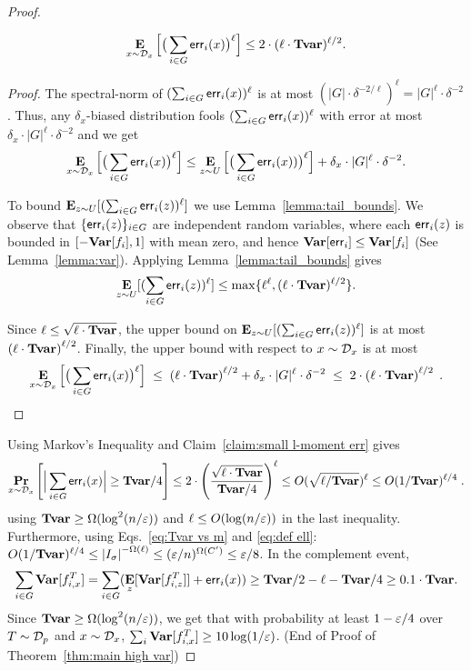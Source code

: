 \begin{proof}
\begin{claim}
	$$\mathop{\bf E\/}_{x\sim {\mathcal{D}_x}}\Big[ \big(\sum_{i\in G} {\mathsf{err}}_i(x)\big)^{\ell}\Big] \le 2 \cdot (\ell \cdot \mathbf{{Tvar}})^{\ell/2}.$$
\end{claim}
\begin{proof}
	The spectral-norm of $(\sum_{i\in G} {\mathsf{err}}_i(x))^{\ell}$ is at most $(|G| \cdot \delta^{-2/\ell})^{\ell}  = |G|^{\ell} \cdot \delta^{-2}$. Thus, any $\delta_x$-biased distribution fools $(\sum_{i\in G} {\mathsf{err}}_i(x))^{\ell}$ with error at most $\delta_x \cdot |G|^{\ell} \cdot \delta^{-2}$ and we get
	$$
	\mathop{\bf E\/}_{x\sim {\mathcal{D}_x}}\Big[ \big(\sum_{i\in G} {\mathsf{err}}_i(x)\big)^{\ell}\Big] \le \mathop{\bf E\/}_{z\sim U}\Big[ \big(\sum_{i\in G} {\mathsf{err}}_i(x))\big)^{\ell}\Big]+ \delta_x \cdot |G|^{\ell} \cdot \delta^{-2}.
	$$
	
	To bound
	$\mathop{\bf E\/}_{z\sim U}[ (\sum_{i\in G} {\mathsf{err}}_i(z))^{\ell}]$ we use Lemma~\ref{lemma:tail_bounds}.
	We observe that $\{{\mathsf{err}}_i(z)\}_{i\in G}$ are independent random variables, where each ${\mathsf{err}}_i(z)$ is bounded in $[-{\mathop{\bf Var\/}}[f_i],1]$ with mean zero, and hence ${\mathop{\bf Var\/}}[{\mathsf{err}}_i] \le {\mathop{\bf Var\/}}[f_i]$ (See Lemma~\ref{lemma:var}). Applying Lemma~\ref{lemma:tail_bounds} gives
	$$
	\mathop{\bf E\/}_{z\sim U}[ (\sum_{i\in G} {\mathsf{err}}_i(z))^{\ell}] \le  
	\max\{\ell^{\ell}, (\ell \cdot \mathbf{{Tvar}})^{\ell/2}\}.$$

Since $\ell \le \sqrt{\ell \cdot \mathbf{{Tvar}}}$, the upper bound on $\mathop{\bf E\/}_{z\sim U}[ (\sum_{i\in G} {\mathsf{err}}_i(z))^{\ell}]$ is at most $\left( \ell \cdot \mathbf{{Tvar}}\right)^{\ell/2}$.
Finally, the upper bound with respect to $x\sim {\mathcal{D}_x}$ is at most \[
\mathop{\bf E\/}_{x\sim {\mathcal{D}_x}}\Big[ \big(\sum_{i\in G} {\mathsf{err}}_i(x)\big)^{\ell}\Big] 
\;\le\;  \left(\ell  \cdot  \mathbf{{Tvar}}\right)^{\ell/2} 
	+ \delta_x \cdot |G|^{\ell} \cdot \delta^{-2}
\;\le\; 2\cdot \left(\ell  \cdot  \mathbf{{Tvar}}\right)^{\ell/2}\;.\qedhere
\]
\end{proof}
%
Using Markov's Inequality and Claim~\ref{claim:small l-moment err} gives \begin{align*}
 \mathop{\bf Pr\/}_{x\sim{\mathcal{D}_x}} \left[\Big|\sum_{i\in G} {\mathsf{err}}_i(x)\Big| \ge \mathbf{{Tvar}} / 4\right]
 \le 2\cdot \left(\frac{\sqrt{\ell \cdot \mathbf{{Tvar}}}}{\mathbf{{Tvar}}/4}\right)^{\ell} \le O(\sqrt{\ell/\mathbf{{Tvar}}})^{\ell}\le O(1/\mathbf{{Tvar}})^{\ell/4}\;.
 \end{align*}
using $\mathbf{{Tvar}} \ge \Omega(\log^2(n/\varepsilon))$ and $\ell \le O(\log(n/\varepsilon))$ in the last inequality.
Furthermore, using Eqs.~\eqref{eq:Tvar vs m} and \eqref{eq:def ell}: $O(1/\mathbf{{Tvar}})^{\ell/4} \le \left|I_{\sigma}\right|^{-\Omega(\ell)} \le (\varepsilon/n)^{\Omega(C')} \le \varepsilon/8$.
In the complement event,
$$
\sum_{i\in G} {\mathop{\bf Var\/}}[f^T_{i,x}] =  \sum_{i\in G}(\mathop{\bf E\/}_{z}[{\mathop{\bf Var\/}}[f^T_{i,z}]] + {\mathsf{err}}_i(x)) \ge \mathbf{{Tvar}}/2 - \ell  - \mathbf{{Tvar}}/4 \ge 0.1 \cdot \mathbf{{Tvar}}.
$$
Since $\mathbf{{Tvar}} \ge \Omega(\log^2(n/\varepsilon))$, we get that with  probability at least $1-\varepsilon/4$ over $T\sim {\mathcal{D}}_p$ and $x\sim {\mathcal{D}_x}$,  $\sum_{i} {\mathop{\bf Var\/}}[f^T_{i,x}]  \ge 10 \log(1/\varepsilon)$. (End of Proof of Theorem~\ref{thm:main high var})
\end{proof}